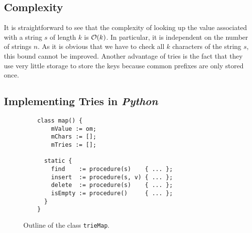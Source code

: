\subsection{Complexity}
It is straightforward to see that the complexity of looking up the value associated with a string
$s$ of length $k$ is $\mathcal{O}(k)$.  In particular, it is independent on the number of strings $n$.  As
it is obvious that we have to check all $k$ characters of the string $s$, this bound cannot be
improved.   Another advantage of tries is the fact that they use very little storage to store the
keys because common prefixes are only stored once. 

\subsection{Implementing Tries in \textsl{Python}}
\begin{figure}[!ht]
\centering
\begin{verbatim}
    class map() {
        mValue := om;
        mChars := [];
        mTries := [];
    
      static {
        find    := procedure(s)    { ... };
        insert  := procedure(s, v) { ... };
        delete  := procedure(s)    { ... };
        isEmpty := procedure()     { ... };
      }
    }
\end{verbatim}
\vspace*{-0.3cm}
\caption{Outline of the class \texttt{trieMap}.}
\label{fig:trie.ipython-outline}
\end{figure}

